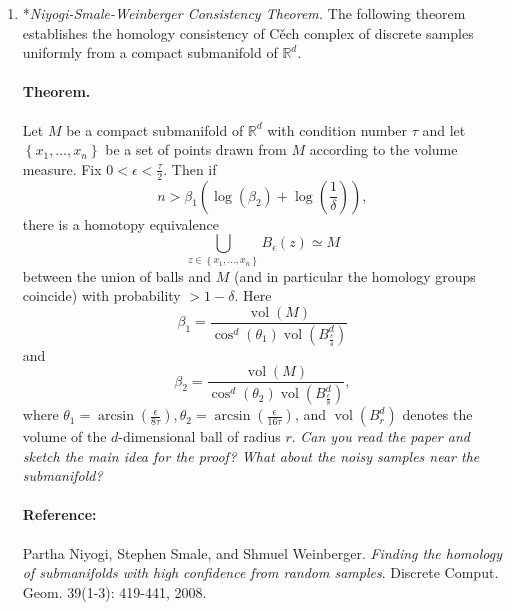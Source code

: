 \documentclass[11pt]{article}
\def\R{{\mathbb R}}
\begin{document}
\begin{enumerate}
\item *{\em Niyogi-Smale-Weinberger Consistency Theorem.} The following theorem establishes the homology consistency of C\v{e}ch complex of discrete samples uniformly from a compact submanifold of $\R^d$. 
\paragraph{Theorem.}{} Let $M$ be a compact submanifold of $\mathbb{R}^{d}$ with condition number $\tau$ and let $\left\{x_{1}, \ldots, x_{n}\right\}$ be a set of points drawn from $M$ according to the volume measure. Fix $0<\epsilon<\frac{\tau}{2}$. Then if
$$
n>\beta_{1}\left(\log \left(\beta_{2}\right)+\log \left(\frac{1}{\delta}\right)\right),
$$
there is a homotopy equivalence
$$
\bigcup_{z \in\left\{x_{1}, \ldots, x_{n}\right\}} B_{\epsilon}(z) \simeq M
$$
between the union of balls and $M$ (and in particular the homology groups coincide) with probability $>1-\delta$.
Here
$$
\beta_{1}=\frac{\operatorname{vol}(M)}{\cos ^{d}\left(\theta_{1}\right) \operatorname{vol}\left(B_{\frac{\epsilon}{4}}^{d}\right)}
$$
and
$$
\beta_{2}=\frac{\operatorname{vol}(M)}{\cos ^{d}\left(\theta_{2}\right) \operatorname{vol}\left(B^d_{\frac{\epsilon}{8}} \right)},
$$
where $\theta_{1}=\arcsin \left(\frac{\epsilon}{8 \tau}\right), \theta_{2}=\arcsin \left(\frac{\epsilon}{16 \tau}\right)$, and $\operatorname{vol}\left(B_{r}^{d}\right)$ denotes the volume of the
$d$-dimensional ball of radius $r$.
\emph{Can you read the paper and sketch the main idea for the proof? What about the noisy samples near the submanifold? }
\paragraph{Reference:} Partha Niyogi, Stephen Smale, and Shmuel Weinberger. \emph{Finding the homology of submanifolds with high confidence from random samples}. Discrete Comput. Geom. 39(1-3): 419-441, 2008.
\end{enumerate}
\end{document}
